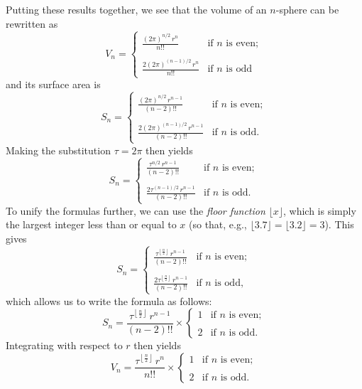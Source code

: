 Putting these results together, we see that the volume of an $n$-sphere can be rewritten as
\[ V_n = \begin{cases}
 \displaystyle \frac{(2\pi)^{n/2}\,r^n}{n!!} & \text{if } n \text{ is even}; \\ \\
 \displaystyle \frac{2(2\pi)^{(n-1)/2}\,r^n}{n!!} & \text{if } n \text{ is odd}
 \end{cases} \]
and its surface area is
\[ S_n = \begin{cases}
 \displaystyle \frac{(2\pi)^{n/2}\,r^{n-1}}{(n-2)!!} & \text{if } n \text{ is even}; \\ \\
 \displaystyle \frac{2(2\pi)^{(n-1)/2}\,r^{n-1}}{(n-2)!!} & \text{if } n \text{ is odd.}
 \end{cases} \]
Making the substitution $\tau=2\pi$ then yields
\[ S_n = \begin{cases}
 \displaystyle \frac{\tau^{n/2}\,r^{n-1}}{(n-2)!!} & \text{if } n \text{ is even}; \\ \\
 \displaystyle \frac{2\tau^{(n-1)/2}\,r^{n-1}}{(n-2)!!} & \text{if } n \text{ is odd.}
 \end{cases} \]
To unify the formulas further, we can use the \emph{floor function} $\lfloor x \rfloor$, which is simply the largest integer less than or equal to $x$ (so that, e.g., $\lfloor 3.7 \rfloor = \lfloor 3.2 \rfloor = 3$). This gives
\[ S_n = \begin{cases}
 \displaystyle \frac{\tau^{\left\lfloor \frac{n}{2} \right\rfloor}\,r^{n-1}}{(n-2)!!} & \text{if } n \text{ is even}; \\ \\
 \displaystyle \frac{2\tau^{\left\lfloor \frac{n}{2} \right\rfloor}\,r^{n-1}}{(n-2)!!} & \text{if } n \text{ is odd},
 \end{cases} \]
which allows us to write the formula as follows:
\[ S_n = \frac{\tau^{\left\lfloor \frac{n}{2} \right\rfloor}\,r^{n-1}}{(n-2)!!}\times \begin{cases}
 1 & \text{if } n \text{ is even}; \\ \\
 2 & \text{if } n \text{ is odd}.
 \end{cases} \]
Integrating with respect to $r$ then yields
\[ V_n = \frac{\tau^{\left\lfloor \frac{n}{2} \right\rfloor}\,r^n}{n!!}\times \begin{cases}
 1 & \text{if } n \text{ is even}; \\ \\
 2 & \text{if } n \text{ is odd}.
 \end{cases} \]

